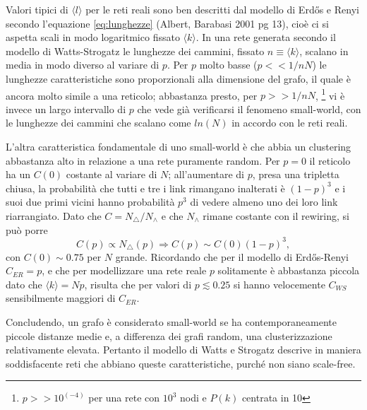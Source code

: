 Valori tipici di $\langle l \rangle$ per le reti reali sono ben descritti dal modello di Erdős e Renyi secondo l'equazione \ref{eq:lunghezze} (Albert, Barabasi 2001 pg 13),
cioè ci si aspetta scali in modo logaritmico fissato $\langle k \rangle$. In una rete generata secondo il modello di Watts-Strogatz le lunghezze dei cammini, fissato $n \equiv \langle k \rangle$, scalano in media in modo diverso al variare di $p$. Per $p$ molto basse ($p << 1/nN$) le lunghezze caratteristiche sono proporzionali alla dimensione del grafo, il quale è ancora molto simile a una reticolo; abbastanza presto, per $p >> 1/nN$, \footnote{$p >> 10^(-4)$ per una rete con $10^3$ nodi e $P(k)$ centrata in 10} vi è invece un largo intervallo di $p$ che vede già verificarsi il fenomeno small-world, con le lunghezze dei cammini che scalano come $ln(N)$ in accordo con le reti reali.  

L'altra caratteristica fondamentale di uno small-world è che abbia un clustering abbastanza alto in relazione a una rete puramente random. Per $p = 0$ il reticolo ha un $C(0)$ costante al variare di $N$; all'aumentare di $p$, presa una tripletta chiusa, la probabilità che tutti e tre i link rimangano inalterati è $(1-p)^3$  e i suoi due primi vicini hanno probabilità $p^3$ di vedere almeno uno dei loro link riarrangiato. Dato che $C=N_\triangle/N_\wedge$ e che $N_\wedge$ rimane costante con il rewiring, si può porre 
\[C(p) \propto N_\triangle (p) \Rightarrow C(p) \sim C(0)(1-p)^3, \]
con $C(0) \sim 0.75$ per $N$ grande. Ricordando che per il modello di Erdős-Renyi $C_{ER}=p$, e che per modellizzare una rete reale $p$ solitamente è abbastanza piccola dato che $\langle k \rangle = Np$, risulta che per valori di $p \lesssim 0.25$ si hanno velocemente $C_{WS}$ sensibilmente maggiori di $C_{ER}$.


Concludendo, un grafo è considerato small-world se ha contemporaneamente piccole distanze medie e, a differenza dei grafi random,  una clusterizzazione relativamente elevata. Pertanto il modello di Watts e Strogatz descrive in maniera soddisfacente reti che abbiano queste caratteristiche, purché non siano scale-free.

